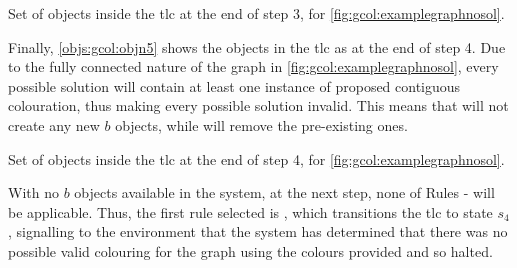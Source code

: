 \begin{cpobjectsfloat}
\begin{cpobjects}

    
    
    
        \cpobjectsline{\vdots}
        
    
    
\end{cpobjects}
\caption{\label{objs:gcol:objn4}Set of objects inside the \gls{tlc} at the end of step 3, for \cref{fig:gcol:examplegraphnosol}.}
\end{cpobjectsfloat}

Finally, \cref{objs:gcol:objn5} shows the objects in the \gls{tlc} as at the end of step 4.  Due to the fully connected nature of the graph in \cref{fig:gcol:examplegraphnosol}, every possible solution will contain at least one instance of proposed contiguous colouration, thus making every possible solution invalid.  This means that  will not create any new \(b\) objects, while  will remove the pre-existing ones.

\begin{cpobjectsfloat}
\begin{cpobjects}

    
\end{cpobjects}
\caption{\label{objs:gcol:objn5}Set of objects inside the \gls{tlc} at the end of step 4, for \cref{fig:gcol:examplegraphnosol}.}
\end{cpobjectsfloat}

With no \(b\) objects available in the system, at the next step, none of Rules - will be applicable.  Thus, the first rule selected is , which transitions the \gls{tlc} to state \(s_4\), signalling to the environment that the system has determined that there was no possible valid colouring for the graph using the colours provided and so halted.